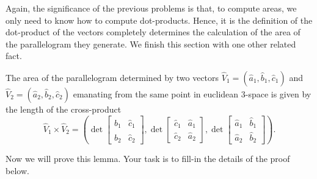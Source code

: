 \documentclass{ximera}
\begin{document}
Again, the significance of the previous problems is that, to compute
areas, we only need to know how to compute dot-products. Hence, it is
the definition of the dot-product of the vectors completely determines
the calculation of the area of the parallelogram they generate.  We
finish this section with one other related fact.

\begin{lemma}
The area of the parallelogram determined by two vectors $\hat{V}_{1}=\left(
\hat{a}_{1},\hat{b}_{1},\hat{c}_{1}\right)  $ and $\hat{V}_{2}=\left(  \hat
{a}_{2},\hat{b}_{2},\hat{c}_{2}\right)  $ emanating from the same point in
euclidean $3$-space is given by the length of the cross-product%
\[
\hat{V}_{1}\times\hat{V}_{2}=\left(
\det\begin{bmatrix}
\hat{b}_{1} & \hat{c}_{1}\\
\hat{b}_{2} & \hat{c}_{2}%
\end{bmatrix},
\det\begin{bmatrix}
\hat{c}_{1} & \hat{a}_{1}\\
\hat{c}_{2} & \hat{a}_{2}%
\end{bmatrix},
\det\begin{bmatrix}
\hat{a}_{1} & \hat{b}_{1}\\
\hat{a}_{2} & \hat{b}_{2}%
\end{bmatrix}
\right).
\]

\end{lemma}

Now we will prove this lemma. Your task is to fill-in the details of
the proof below.
\end{document}
